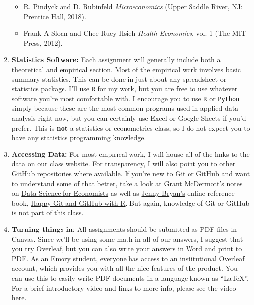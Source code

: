 \documentclass[11pt,]{article}
\providecommand{\tightlist}{%
  \setlength{\itemsep}{0pt}\setlength{\parskip}{0pt}}
\begin{document}
\begin{enumerate}
  \begin{itemize}
  \tightlist
  \item
    R. Pindyck and D. Rubinfeld \emph{Microeconomics} (Upper Saddle
    River, NJ: Prentice Hall, 2018).
  \item
    Frank A Sloan and Chee-Ruey Hsieh \emph{Health Economics}, vol. 1
    (The MIT Press, 2012).
  \end{itemize}
\item
  \textbf{Statistics Software:} Each assignment will generally include
  both a theoretical and empirical section. Most of the empirical work
  involves basic summary statistics. This can be done in just about any
  spreadsheet or statistics package. I'll use \texttt{R} for my work,
  but you are free to use whatever software you're most comfortable
  with. I encourage you to use \texttt{R} or \texttt{Python} simply
  because these are the most common programs used in applied data
  analysis right now, but you can certainly use Excel or Google Sheets
  if you'd prefer. This is \textbf{not} a statistics or econometrics
  class, so I do not expect you to have any statistics programming
  knowledge.
\item
  \textbf{Accessing Data:} For most empirical work, I will house all of
  the links to the data on our class website. For transparency, I will
  also point you to other GitHub repositories where available. If you're
  new to Git or GitHub and want to understand some of that better, take
  a look at \href{https://grantmcdermott.com/}{Grant McDermott's} notes
  on \href{https://github.com/uo-ec607/lectures}{Data Science for
  Economists} as well as \href{https://jennybryan.org/}{Jenny Bryan's}
  online reference book, \href{https://happygitwithr.com/}{Happy Git and
  GitHub with R}. But again, knowledge of Git or GitHub is not part of
  this class.
\item
  \textbf{Turning things in:} All assignments should be submitted as PDF
  files in Canvas. Since we'll be using some math in all of our answers,
  I suggest that you try \href{https://www.overleaf.com/}{Overleaf}, but
  you can also write your answers in Word and print to PDF. As an Emory
  student, everyone has access to an institutional Overleaf account,
  which provides you with all the nice features of the product. You can
  use this to easily write PDF documents in a language known as
  ``LaTeX''. For a brief introductory video and links to more info,
  please see the video
  \href{https://www.overleaf.com/learn/latex/Questions/Getting_started_with_LaTeX_and_Overleaf_(formerly_writeLaTeX)}{here}.
\end{enumerate}
\end{document}

